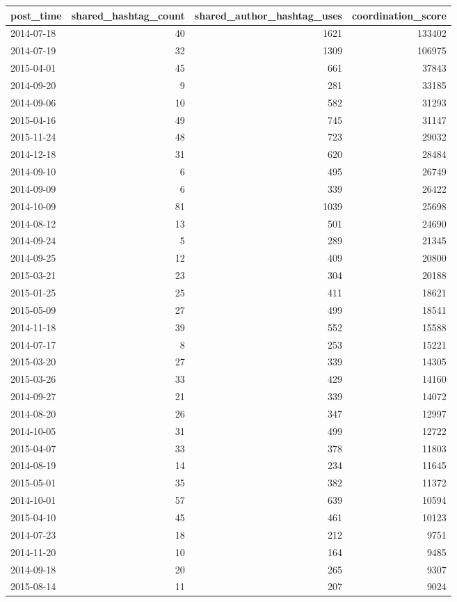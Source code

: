 \begin{tabular}{lrrr}
\toprule
post\_time & shared\_hashtag\_count & shared\_author\_hashtag\_uses & coordination\_score \\
\midrule
2014-07-18 & 40 & 1621 & 133402 \\
2014-07-19 & 32 & 1309 & 106975 \\
2015-04-01 & 45 & 661 & 37843 \\
2014-09-20 & 9 & 281 & 33185 \\
2014-09-06 & 10 & 582 & 31293 \\
2015-04-16 & 49 & 745 & 31147 \\
2015-11-24 & 48 & 723 & 29032 \\
2014-12-18 & 31 & 620 & 28484 \\
2014-09-10 & 6 & 495 & 26749 \\
2014-09-09 & 6 & 339 & 26422 \\
2014-10-09 & 81 & 1039 & 25698 \\
2014-08-12 & 13 & 501 & 24690 \\
2014-09-24 & 5 & 289 & 21345 \\
2014-09-25 & 12 & 409 & 20800 \\
2015-03-21 & 23 & 304 & 20188 \\
2015-01-25 & 25 & 411 & 18621 \\
2015-05-09 & 27 & 499 & 18541 \\
2014-11-18 & 39 & 552 & 15588 \\
2014-07-17 & 8 & 253 & 15221 \\
2015-03-20 & 27 & 339 & 14305 \\
2015-03-26 & 33 & 429 & 14160 \\
2014-09-27 & 21 & 339 & 14072 \\
2014-08-20 & 26 & 347 & 12997 \\
2014-10-05 & 31 & 499 & 12722 \\
2015-04-07 & 33 & 378 & 11803 \\
2014-08-19 & 14 & 234 & 11645 \\
2015-05-01 & 35 & 382 & 11372 \\
2014-10-01 & 57 & 639 & 10594 \\
2015-04-10 & 45 & 461 & 10123 \\
2014-07-23 & 18 & 212 & 9751 \\
2014-11-20 & 10 & 164 & 9485 \\
2014-09-18 & 20 & 265 & 9307 \\
2015-08-14 & 11 & 207 & 9024 \\

\end{tabular}
